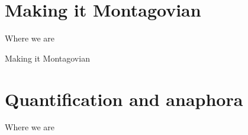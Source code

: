 \documentclass[presentation]{beamer}
\begin{document}
\section{Making it Montagovian}
\label{sec:org9dfb4fa}

\begin{frame}[label={sec:org752674b}]{Where we are}
\tableofcontents[currentsection]
\end{frame}

\begin{frame}[label={sec:org467942f}]{Making it Montagovian}
\end{frame}

\section{Quantification and anaphora}
\label{sec:org545d664}

\begin{frame}[label={sec:orgd301f58}]{Where we are}
\tableofcontents[currentsection]
\end{frame}
\end{document}
